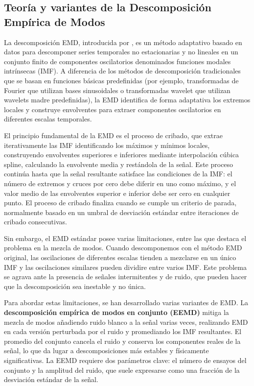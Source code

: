 \documentclass[11pt,a4paper]{article}
\begin{document}
\subsection{Teoría y variantes de la Descomposición Empírica de Modos}

La descomposición EMD, introducida por \citep{huang1998empirical}, es un método adaptativo basado en datos para descomponer series temporales no estacionarias y no lineales en un conjunto finito de componentes oscilatorios denominados funciones modales intrínsecas (IMF). A diferencia de los métodos de descomposición tradicionales que se basan en funciones básicas predefinidas (por ejemplo, transformadas de Fourier que utilizan bases sinusoidales o transformadas wavelet que utilizan wavelets madre predefinidas), la EMD identifica de forma adaptativa los extremos locales y construye envolventes para extraer componentes oscilatorios en diferentes escalas temporales.

El principio fundamental de la EMD es el proceso de cribado, que extrae iterativamente las IMF identificando los máximos y mínimos locales, construyendo envolventes superiores e inferiores mediante interpolación cúbica spline, calculando la envolvente media y restándola de la señal. Este proceso continúa hasta que la señal resultante satisface las condiciones de la IMF: el número de extremos y cruces por cero debe diferir en uno como máximo, y el valor medio de las envolventes superior e inferior debe ser cero en cualquier punto. El proceso de cribado finaliza cuando se cumple un criterio de parada, normalmente basado en un umbral de desviación estándar entre iteraciones de cribado consecutivas.

Sin embargo, el EMD estándar posee varias limitaciones, entre las que destaca el problema en la mezcla de modos. Cuando descomponemos con el método EMD original, las oscilaciones de diferentes escalas tienden a mezclarse en un único IMF y las oscilaciones similares pueden dividire entre varios IMF. Este problema se agrava ante la presencia de señales intermitentes y de ruido, que pueden hacer que la descomposición sea inestable y no única.

Para abordar estas limitaciones, se han desarrollado varias variantes de EMD. La \textbf{descomposición empírica de modos en conjunto (EEMD)} \citep{wu2009ensemble} mitiga la mezcla de modos añadiendo ruido blanco a la señal varias veces, realizando EMD en cada versión perturbada por el ruido y promediando los IMF resultantes. El promedio del conjunto cancela el ruido y conserva los componentes reales de la señal, lo que da lugar a descomposiciones más estables y físicamente significativas. La EEMD requiere dos parámetros clave: el número de ensayos del conjunto y la amplitud del ruido, que suele expresarse como una fracción de la desviación estándar de la señal.
\end{document}

